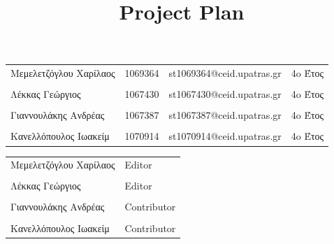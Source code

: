 \documentclass{../ol-softwaremanual}
\begin{document}
	
	
	\begin{titlepage}
		
		
		\title{\en Project Plan \\}
	\end{titlepage}
	
	
	\maketitle
	
	\newpage
	
	
	\vspace{20pt}
	
	
	
	\begin{table}[htbp!]
		
		\begin{tabular}{llll}
			Μεμελετζόγλου Χαρίλαος & 1069364 & \en st1069364@ceid.upatras.gr & 4o Έτος   \\ 
			\\ Λέκκας Γεώργιος      &      1067430    &   \en st1067430@ceid.upatras.gr & 4o Έτος  \\
			\\ Γιαννουλάκης Ανδρέας        &   1067387       & \en st1067387@ceid.upatras.gr & 4o Έτος           \\
			\\ Κανελλόπουλος Ιωακείμ        &  1070914        &    \en st1070914@ceid.upatras.gr & 4o Έτος        \\ 
		\end{tabular}
	\end{table}
	
	
	\vspace{20pt}
	
	\begin{table}[htbp!]
		\begin{tabular}{ll}
			Μεμελετζόγλου Χαρίλαος & \en Editor \\
			\\ Λέκκας Γεώργιος      &   \en  Editor \\
			\\ Γιαννουλάκης Ανδρέας & \en Contributor \\
			\\ Κανελλόπουλος Ιωακείμ & \en Contributor \\ 
		\end{tabular}
	\end{table}
	
\end{document}
